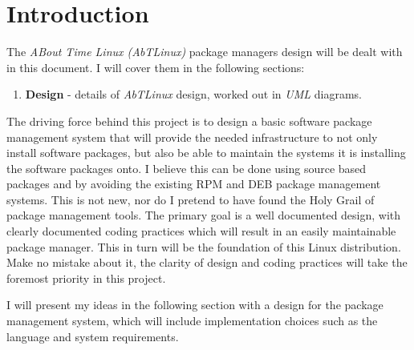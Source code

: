 \section{Introduction}  
The \emph{ABout Time Linux (AbTLinux)} package managers design will be dealt with in
this document. I will cover them in the following sections:
 
\begin{enumerate}
	\item \textbf{Design} - details of \emph{AbTLinux} design, worked out in
		\emph{UML} diagrams.
\end{enumerate}

The driving force behind this project is to design a basic software
package management system that will provide the needed infrastructure to not
only install software packages, but also be able to maintain the systems it is
installing the software packages onto. I believe this can be done using
source based packages and by avoiding the existing RPM and DEB package
management systems. This is not new, nor do I pretend to have found the Holy
Grail of package management tools. The primary goal is a well documented design, with
clearly documented coding practices which will result in an easily
maintainable package manager. This in turn will be the foundation of this Linux
distribution. Make no mistake about it, the clarity of design and coding
practices will take the foremost priority in this project.

I will present my ideas in the following section with a design for the package
management system, which will include implementation choices such as the
language and system requirements.
